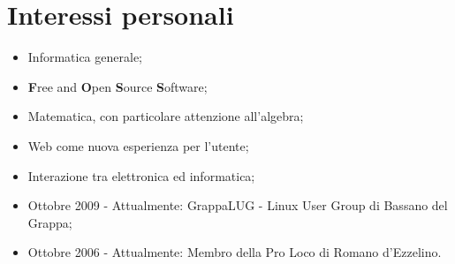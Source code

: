 \documentclass[pdftex, a4paper, 11pt]{article}
\begin{document}


\section*{Interessi personali}
\begin{itemize}
\item Informatica generale;
\item {\bf F}ree and {\bf O}pen {\bf S}ource {\bf S}oftware;
\item Matematica, con particolare attenzione all'algebra;
\item Web come nuova esperienza per l'utente;
\item Interazione tra elettronica ed informatica;
\item Ottobre 2009 - Attualmente: GrappaLUG - Linux User Group di Bassano del Grappa;
\item Ottobre 2006 - Attualmente: Membro della Pro Loco di Romano d'Ezzelino.
\end{itemize}
\end{document}
